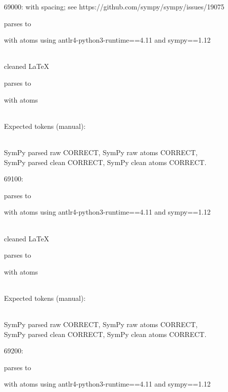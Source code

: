 \documentclass{article}
\begin{document}
\hrulefill

69000:
with spacing; see https://github.com/sympy/sympy/issues/19075

parses to

with atoms
using antlr4-python3-runtime==4.11 and sympy==1.12

\ \\
cleaned \LaTeX

parses to

with atoms


\ \\
Expected tokens (manual):



\ \\
SymPy parsed raw CORRECT, 
SymPy raw atoms CORRECT, \\
SymPy parsed clean CORRECT, 
SymPy clean atoms CORRECT.

\hrulefill

69100:

parses to

with atoms
using antlr4-python3-runtime==4.11 and sympy==1.12

\ \\
cleaned \LaTeX

parses to

with atoms


\ \\
Expected tokens (manual):


\ \\
SymPy parsed raw CORRECT, 
SymPy raw atoms CORRECT, \\
SymPy parsed clean CORRECT, 
SymPy clean atoms CORRECT.

\hrulefill

69200:

parses to

with atoms
using antlr4-python3-runtime==4.11 and sympy==1.12
\end{document}

